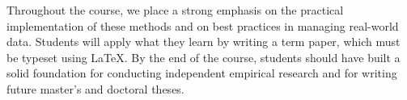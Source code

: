 \documentclass[11pt]{article}
\begin{document}
Throughout the course, we place a strong emphasis on the practical implementation of these methods and on best practices in managing real-world data. Students will apply what they learn by writing a term paper, which must be typeset using LaTeX. By the end of the course, students should have built a solid foundation for conducting independent empirical research and for writing future master's and doctoral theses.











\end{document}
